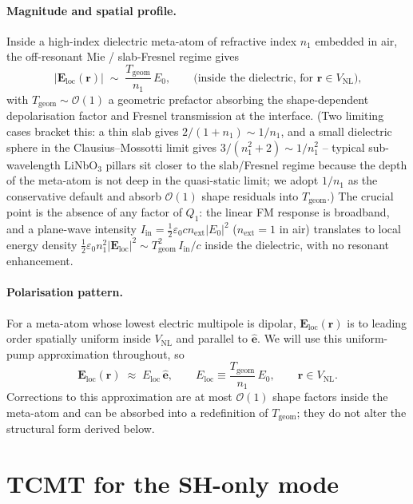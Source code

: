 \documentclass[11pt,a4paper]{article}
\newcommand{\eps}{\varepsilon}
\newcommand{\bvec}[1]{\mathbf{#1}}
\newcommand{\E}{\bvec{E}}
\newcommand{\ri}{\bvec{r}}
\newcommand{\Einc}{\E_{\text{loc}}}
\newcommand{\VNL}{V_{\text{NL}}}
\begin{document}
\paragraph{Magnitude and spatial profile.}
Inside a high-index dielectric meta-atom of refractive index $n_1$ embedded
in air, the off-resonant Mie / slab-Fresnel regime gives
\begin{equation}
  |\Einc(\ri)|\;\sim\;\frac{T_\text{geom}}{n_1}\,E_0,
  \qquad \text{(inside the dielectric, for }\ri\in\VNL\text{),}
  \label{eq:Eloc-magnitude}
\end{equation}
with $T_\text{geom}\sim\mathcal O(1)$ a geometric prefactor absorbing the
shape-dependent depolarisation factor and Fresnel transmission at the
interface.  (Two limiting cases bracket this: a thin slab gives
$2/(1+n_1)\sim 1/n_1$, and a small dielectric sphere in the
Clausius--Mossotti limit gives $3/(n_1^{2}+2)\sim 1/n_1^{2}$ -- typical
sub-wavelength LiNbO$_3$ pillars sit closer to the slab/Fresnel regime
because the depth of the meta-atom is not deep in the quasi-static limit;
we adopt $1/n_1$ as the conservative default and absorb $\mathcal O(1)$
shape residuals into $T_\text{geom}$.)  The crucial point is the absence
of any factor of $Q_1$: the linear FM response is broadband, and a
plane-wave intensity $I_\text{in}=\tfrac12\eps_0 c n_\text{ext}|E_0|^{2}$
($n_\text{ext}=1$ in air) translates to local energy density
$\tfrac12\eps_0 n_1^{2}|\Einc|^{2}\sim T_\text{geom}^{2}\,I_\text{in}/c$
inside the dielectric, with no resonant enhancement.

\paragraph{Polarisation pattern.}
For a meta-atom whose lowest electric multipole is dipolar, $\Einc(\ri)$ is
to leading order spatially uniform inside $\VNL$ and parallel to
$\hat{\bm e}$.  We will use this uniform-pump approximation throughout, so
\begin{equation}
  \Einc(\ri)\;\approx\;E_\text{loc}\,\hat{\bm e},
  \qquad
  E_\text{loc}\equiv \frac{T_\text{geom}}{n_1}\,E_0,
  \qquad \ri\in\VNL.
  \label{eq:Eloc-uniform}
\end{equation}
Corrections to this approximation are at most $\mathcal O(1)$ shape factors
inside the meta-atom and can be absorbed into a redefinition of
$T_\text{geom}$; they do not alter the structural form derived below.

\section{TCMT for the SH-only mode}\label{sec:tcmt-1R}
\end{document}
